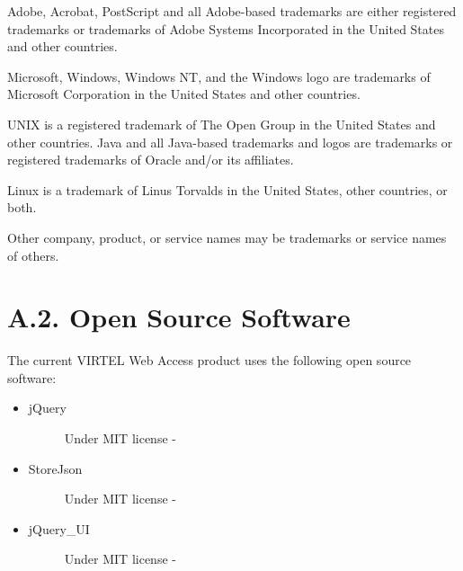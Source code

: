 \documentclass[letterpaper,10pt,english]{sphinxmanual}
\begin{document}
Adobe, Acrobat, PostScript and all Adobe-based trademarks are either registered trademarks or trademarks of Adobe
Systems Incorporated in the United States and other countries.

Microsoft, Windows, Windows NT, and the Windows logo are trademarks of Microsoft Corporation in the United States
and other countries.

UNIX is a registered trademark of The Open Group in the United States and other countries.
Java and all Java-based trademarks and logos are trademarks or registered trademarks of Oracle and/or its affiliates.

Linux is a trademark of Linus Torvalds in the United States, other countries, or both.

Other company, product, or service names may be trademarks or service names of others.


\section{A.2. Open Source Software}
\label{\detokenize{Installation_Guide:a-2-open-source-software}}
The current VIRTEL Web Access product uses the following open source software:
\begin{itemize}
\item {} \begin{description}
\item[{jQuery}] \leavevmode
Under MIT license - 

\end{description}

\item {} \begin{description}
\item[{StoreJson}] \leavevmode
Under MIT license - 

\end{description}

\item {} \begin{description}
\item[{jQuery\_UI}] \leavevmode
Under MIT license - 

\end{description}

\end{itemize}



\renewcommand{\indexname}{Index}
\printindex
\end{document}
